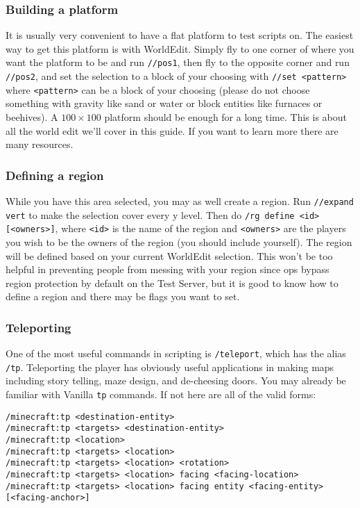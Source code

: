 \documentclass[oneside]{book}
\begin{document}
\subsubsection*{Building a platform}

It is usually very convenient to have a flat platform to test scripts on. The easiest way to get this platform is with WorldEdit. Simply fly to one corner of where you want the platform to be and run \texttt{//pos1}, then fly to the opposite corner and run \texttt{//pos2}, and set the selection to a block of your choosing with \texttt{//set <pattern>} where \texttt{<pattern>} can be a block of your choosing (please do not choose something with gravity like sand or water or block entities like furnaces or beehives). A $100 \times 100$ platform should be enough for a long time. This is about all the world edit we'll cover in this guide. If you want to learn more there are many resources. %

\subsubsection*{Defining a region}

While you have this area selected, you may as well create a region. Run \texttt{//expand vert} to make the selection cover every y level. Then do \texttt{/rg define <id> [<owners>]}, where \texttt{<id>} is the name of the region and \texttt{<owners>} are the players you wish to be the owners of the region (you should include yourself). The region will be defined based on your current WorldEdit selection. This won't be too helpful in preventing people from messing with your region since ops bypass region protection by default on the Test Server, but it is good to know how to define a region and there may be flags you want to set.

\subsubsection*{Teleporting}

One of the most useful commands in scripting is \texttt{/teleport}, which has the alias \texttt{/tp}. Teleporting the player has obviously useful applications in making maps including story telling, maze design, and de-cheesing doors. You may already be familiar with Vanilla \texttt{tp} commands. If not here are all of the valid forms:

\begin{verbatim}
/minecraft:tp <destination-entity>
/minecraft:tp <targets> <destination-entity>
/minecraft:tp <location>
/minecraft:tp <targets> <location>
/minecraft:tp <targets> <location> <rotation>
/minecraft:tp <targets> <location> facing <facing-location>
/minecraft:tp <targets> <location> facing entity <facing-entity>
[<facing-anchor>]
\end{verbatim}
\end{document}
